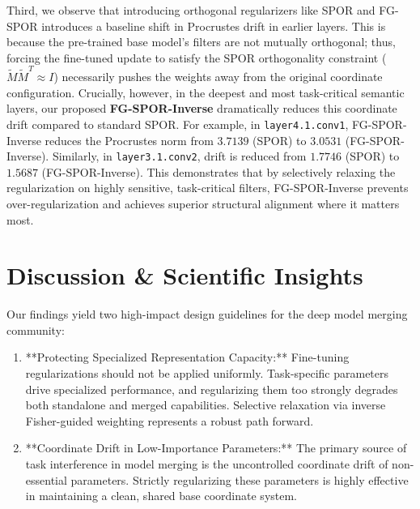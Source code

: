 \documentclass{article}
\theoremstyle{plain}
\theoremstyle{definition}
\theoremstyle{remark}
\begin{document}
Third, we observe that introducing orthogonal regularizers like SPOR and FG-SPOR introduces a baseline shift in Procrustes drift in earlier layers. This is because the pre-trained base model's filters are not mutually orthogonal; thus, forcing the fine-tuned update to satisfy the SPOR orthogonality constraint ($\tilde{M}\tilde{M}^T \approx I$) necessarily pushes the weights away from the original coordinate configuration. Crucially, however, in the deepest and most task-critical semantic layers, our proposed \textbf{FG-SPOR-Inverse} dramatically reduces this coordinate drift compared to standard SPOR. For example, in \texttt{layer4.1.conv1}, FG-SPOR-Inverse reduces the Procrustes norm from $3.7139$ (SPOR) to $3.0531$ (FG-SPOR-Inverse). Similarly, in \texttt{layer3.1.conv2}, drift is reduced from $1.7746$ (SPOR) to $1.5687$ (FG-SPOR-Inverse). This demonstrates that by selectively relaxing the regularization on highly sensitive, task-critical filters, FG-SPOR-Inverse prevents over-regularization and achieves superior structural alignment where it matters most.

\section{Discussion \& Scientific Insights}
\label{submission-discussion}
Our findings yield two high-impact design guidelines for the deep model merging community:
\begin{enumerate}
    \item **Protecting Specialized Representation Capacity:** Fine-tuning regularizations should not be applied uniformly. Task-specific parameters drive specialized performance, and regularizing them too strongly degrades both standalone and merged capabilities. Selective relaxation via inverse Fisher-guided weighting represents a robust path forward.
    \item **Coordinate Drift in Low-Importance Parameters:** The primary source of task interference in model merging is the uncontrolled coordinate drift of non-essential parameters. Strictly regularizing these parameters is highly effective in maintaining a clean, shared base coordinate system.
\end{enumerate}
\end{document}
